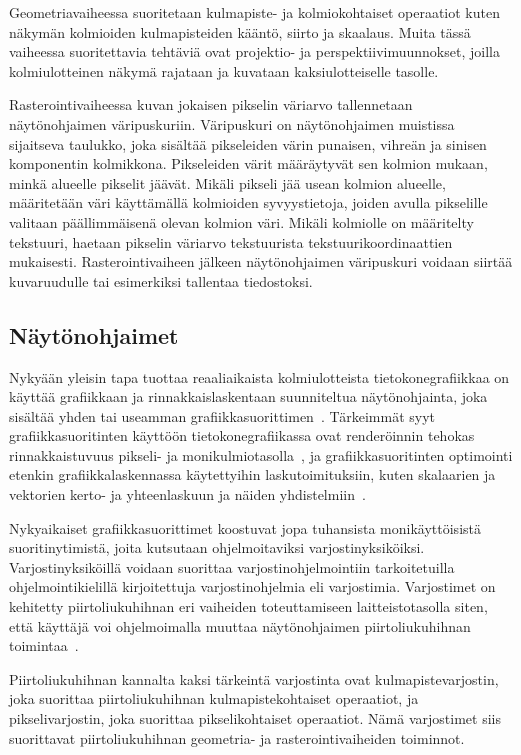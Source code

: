 \documentclass[finnish]{tktltiki2}
\theoremstyle{definition}
\theoremstyle{remark}
\begin{document}
Geometriavaiheessa suoritetaan kulmapiste- ja kolmiokohtaiset operaatiot kuten näkymän kolmioiden kulmapisteiden kääntö, siirto ja skaalaus. Muita tässä vaiheessa suoritettavia tehtäviä ovat projektio- ja perspektiivimuunnokset, joilla kolmiulotteinen näkymä rajataan ja kuvataan kaksiulotteiselle tasolle.

Rasterointivaiheessa kuvan jokaisen pikselin väriarvo tallennetaan näytönohjaimen väripuskuriin. Väripuskuri on näytönohjaimen muistissa sijaitseva taulukko, joka sisältää pikseleiden värin punaisen, vihreän ja sinisen komponentin kolmikkona. Pikseleiden värit määräytyvät sen kolmion mukaan, minkä alueelle pikselit jäävät. Mikäli pikseli jää usean kolmion alueelle, määritetään väri käyttämällä kolmioiden syvyystietoja, joiden avulla pikselille valitaan päällimmäisenä olevan kolmion väri. Mikäli kolmiolle on määritelty tekstuuri, haetaan pikselin väriarvo tekstuurista tekstuurikoordinaattien mukaisesti. Rasterointivaiheen jälkeen näytönohjaimen väripuskuri voidaan siirtää kuvaruudulle tai esimerkiksi tallentaa tiedostoksi.

\subsection{Näytönohjaimet}
Nykyään yleisin tapa tuottaa reaaliaikaista kolmiulotteista tietokonegrafiikkaa on käyttää grafiikkaan ja rinnakkaislaskentaan suunniteltua näytönohjainta, joka sisältää yhden tai useamman grafiikkasuorittimen~\cite[s. 18]{Hughes}. Tärkeimmät syyt grafiikkasuoritinten käyttöön tietokonegrafiikassa ovat renderöinnin tehokas rinnakkaistuvuus pikseli- ja monikulmiotasolla~\cite{Crockett}, ja grafiikkasuoritinten optimointi etenkin grafiikkalaskennassa käytettyihin laskutoimituksiin, kuten skalaarien ja vektorien kerto- ja yhteenlaskuun ja näiden yhdistelmiin~\cite[s. 32]{Moller}.

Nykyaikaiset grafiikkasuorittimet koostuvat jopa tuhansista monikäyttöisistä suoritinytimistä, joita kutsutaan ohjelmoitaviksi varjostinyksiköiksi. Varjostinyksiköillä voidaan suorittaa varjostinohjelmointiin tarkoitetuilla ohjelmointikielillä kirjoitettuja varjostinohjelmia eli varjostimia. Varjostimet on kehitetty piirtoliukuhihnan eri vaiheiden toteuttamiseen laitteistotasolla siten, että käyttäjä voi ohjelmoimalla muuttaa näytönohjaimen piirtoliukuhihnan toimintaa~\cite[s. 927-931]{Hughes}.

Piirtoliukuhihnan kannalta kaksi tärkeintä varjostinta ovat kulmapistevarjostin, joka suorittaa piirtoliukuhihnan kulmapistekohtaiset operaatiot, ja pikselivarjostin, joka suorittaa pikselikohtaiset operaatiot. Nämä varjostimet siis suorittavat piirtoliukuhihnan geometria- ja rasterointivaiheiden toiminnot. 
\end{document}
